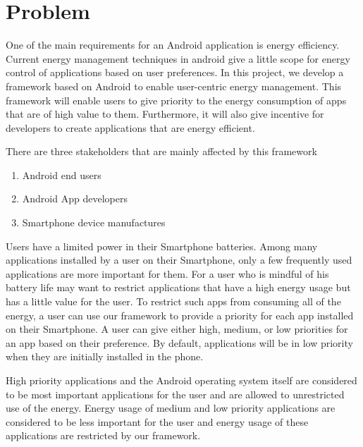 \section{Problem}
\label{motivation}


One of the main requirements for an Android application is energy efficiency. Current energy management techniques in android give a little scope for energy control of applications based on user preferences. In this project, we develop a framework based on Android to enable user-centric energy management. This framework will enable users to give priority to the energy consumption of apps that are of high value to them. Furthermore, it will also give incentive for developers to create applications that are energy efficient. 


There are three stakeholders that are mainly affected by this framework

\begin{enumerate}

\item Android end users
\item Android App developers
\item Smartphone device manufactures

\end{enumerate}

Users have a limited power in their Smartphone batteries. Among many applications installed by a user on their Smartphone, only a few frequently used applications are more important for them. For a user who is mindful of his battery life may want to restrict applications that have a high energy usage but has a little value for the user. To restrict such apps from consuming all of the energy, a user can use our framework to provide a priority for each app installed on their Smartphone. A user can give either high, medium, or low priorities for an app based on their preference. By default, applications will be in low priority when they are initially installed in the phone. 

High priority applications and the Android operating system itself are considered to be most important applications for the user and are allowed to unrestricted use of the energy. Energy usage of medium and low priority applications are considered to be less important for the user and energy usage of these applications are restricted by our framework. 


